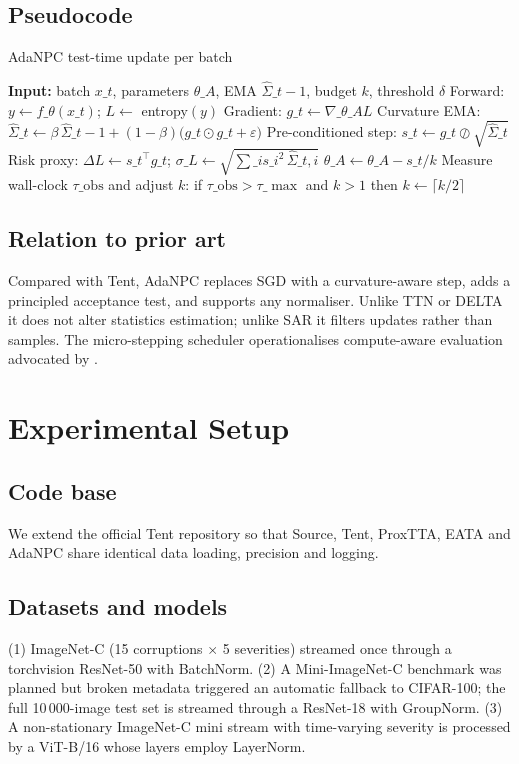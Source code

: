 \documentclass{article} %
\begin{document}
\subsection{Pseudocode}
\begin{algorithm}[H]
\caption{AdaNPC test-time update per batch}
\begin{algorithmic}[1]
  \State \textbf{Input:} batch \(x\_t\), parameters \(\theta\_A\), EMA \(\hat{\Sigma}\_{t-1}\), budget \(k\), threshold \(\delta\)
  \State Forward: \(y \leftarrow f\_{\theta}(x\_t)\); \(L \leftarrow \) entropy\((y)\)
  \State Gradient: \(g\_t \leftarrow \nabla\_{\theta\_A} L\)
  \State Curvature EMA: \(\hat{\Sigma}\_t \leftarrow \beta\,\hat{\Sigma}\_{t-1} + (1-\beta)\big(g\_t \odot g\_t + \varepsilon\big)\)
  \State Pre-conditioned step: \(s\_t \leftarrow g\_t \oslash \sqrt{\hat{\Sigma}\_t}\)
  \State Risk proxy: \(\Delta L \leftarrow s\_t^{\top} g\_t\); \(\sigma\_L \leftarrow \sqrt{\sum\_i s\_i^2\,\hat{\Sigma}\_{t,i}}\)
      \State \(\theta\_A \leftarrow \theta\_A - s\_t/k\)
    \EndFor
  \EndIf
  \State Measure wall-clock \(\tau\_{\mathrm{obs}}\) and adjust \(k\): if \(\tau\_{\mathrm{obs}} > \tau\_{\max}\) and \(k>1\) then \(k \leftarrow \lceil k/2 \rceil\)
\end{algorithmic}
\end{algorithm}
\subsection{Relation to prior art}
Compared with Tent, AdaNPC replaces SGD with a curvature-aware step, adds a principled acceptance test, and supports any normaliser. Unlike TTN or DELTA it does not alter statistics estimation; unlike SAR it filters updates rather than samples. The micro-stepping scheduler operationalises compute-aware evaluation advocated by \cite{alfarra-2023-evaluation}.

\section{Experimental Setup}
\label{sec:experimental}
\subsection{Code base}
We extend the official Tent repository so that Source, Tent, ProxTTA, EATA and AdaNPC share identical data loading, precision and logging.
\subsection{Datasets and models}
(1) ImageNet-C (15 corruptions \(\times\) 5 severities) streamed once through a torchvision ResNet-50 with BatchNorm. (2) A Mini-ImageNet-C benchmark was planned but broken metadata triggered an automatic fallback to CIFAR-100; the full 10\,000-image test set is streamed through a ResNet-18 with GroupNorm. (3) A non-stationary ImageNet-C mini stream with time-varying severity is processed by a ViT-B/16 whose layers employ LayerNorm.
\end{document}
